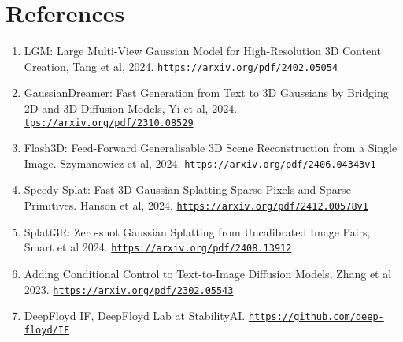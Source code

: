 \documentclass[10pt,twocolumn,letterpaper]{article}
\begin{document}
\section*{References}

\begin{enumerate}
	\item LGM: Large Multi-View Gaussian Model for High-Resolution 3D Content Creation, Tang et al, 2024. 
   	 \href{https://arxiv.org/pdf/2402.05054}{\nolinkurl{https://arxiv.org/pdf/2402.05054}}
	\item GaussianDreamer: Fast Generation from Text to 3D Gaussians by Bridging 2D and 3D Diffusion Models, Yi et al, 2024. 
	\href{tps://arxiv.org/pdf/2310.08529}{\nolinkurl{tps://arxiv.org/pdf/2310.08529}}
	\item Flash3D: Feed-Forward Generalisable 3D Scene Reconstruction from a Single Image. Szymanowicz et al, 2024. 
	\href{https://arxiv.org/pdf/2406.04343v1}{\nolinkurl{https://arxiv.org/pdf/2406.04343v1}}
	\item Speedy-Splat: Fast 3D Gaussian Splatting Sparse Pixels and Sparse Primitives. Hanson et al, 2024.
	\href{https://arxiv.org/pdf/2412.00578v1}{\nolinkurl{https://arxiv.org/pdf/2412.00578v1}}
	\item Splatt3R: Zero-shot Gaussian Splatting from Uncalibrated Image Pairs, Smart et al 2024. 
	\href{https://arxiv.org/pdf/2408.13912}{\nolinkurl{https://arxiv.org/pdf/2408.13912}}
	\item Adding Conditional Control to Text-to-Image Diffusion Models, Zhang et al 2023. 
	\href{https://arxiv.org/pdf/2302.05543}{\nolinkurl{https://arxiv.org/pdf/2302.05543}}
	\item DeepFloyd IF, DeepFloyd Lab at StabilityAI. 
	\href{https://github.com/deep-floyd/IF}{\nolinkurl{https://github.com/deep-floyd/IF}}

	
\end{enumerate}
\end{document}
